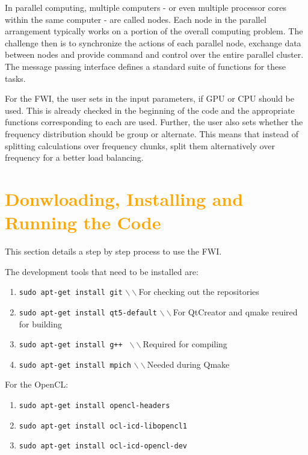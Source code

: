 \documentclass[10pt,a4paper]{article}
\newcommand{\oldstmtwo}[1]{\xout{#1}}
\begin{document}
In parallel computing, multiple computers - or even multiple processor
cores within the same computer - are called nodes.  Each node in the
parallel arrangement typically works on a portion of the overall
computing problem. The challenge then is to synchronize the actions of
each parallel node, exchange data between nodes and provide command
and control over the entire parallel cluster. The message passing
interface defines a standard suite of functions for these tasks.

For the FWI, the user sets in the input parameters, if GPU or CPU
should be used. This is already checked in the beginning of the code
and the appropriate functions corresponding to each are used. Further,
the user also sets whether the frequency distribution should be group
or alternate. This means that instead of splitting calculations over
frequency chunks, split them alternatively over frequency for a better
load balancing.

\section{\textcolor{orange}{Donwloading, Installing and Running the Code}}
\oldstmtwo{\textbf{4. How to use the FWI}}

This section details a step by step process to use the FWI.


The development tools that need to be installed are:
\begin{enumerate}
    \item \texttt{sudo apt-get install git}  $\backslash\backslash$For
checking out the repositories
    \item \texttt{sudo apt-get install qt5-default}
$\backslash\backslash$For QtCreator and qmake reuired for building
    \item \texttt{sudo apt-get install g++ }
$\backslash\backslash$Required for compiling
    \item \texttt{sudo apt-get install mpich}
$\backslash\backslash$Needed during Qmake
\end{enumerate}

For the OpenCL:
\begin{enumerate}
    \item \texttt{sudo apt-get install opencl-headers}
    \item \texttt{sudo apt-get install ocl-icd-libopencl1}
    \item \texttt{sudo apt-get install ocl-icd-opencl-dev}
\end{enumerate}
\end{document}
